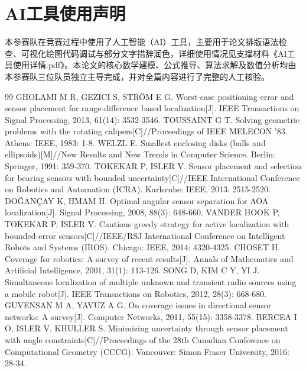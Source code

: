 \documentclass[zihao=-4,a4paper,UTF8]{ctexart}
\begin{document}
\section*{AI工具使用声明}
本参赛队在竞赛过程中使用了人工智能（AI）工具，主要用于论文排版语法检查、可视化绘图代码调试与部分文字措辞润色，详细使用情况见支撑材料《AI工具使用详情.pdf》。本论文的核心数学建模、公式推导、算法求解及数值分析均由本参赛队三位队员独立主导完成，并对全篇内容进行了完整的人工核验。

\begin{thebibliography}{99}
\setlength{\itemsep}{-1.5pt}
\setlength{\parskip}{0pt}
 GHOLAMI M R, GEZICI S, STR\"OM E G. Worst-case positioning error and sensor placement for range-difference based localization[J]. IEEE Transactions on Signal Processing, 2013, 61(14): 3532-3546.
 TOUSSAINT G T. Solving geometric problems with the rotating calipers[C]//Proceedings of IEEE MELECON '83. Athens: IEEE, 1983: 1-8.
 WELZL E. Smallest enclosing disks (balls and ellipsoids)[M]//New Results and New Trends in Computer Science. Berlin: Springer, 1991: 359-370.
 TOKEKAR P, ISLER V. Sensor placement and selection for bearing sensors with bounded uncertainty[C]//IEEE International Conference on Robotics and Automation (ICRA). Karlsruhe: IEEE, 2013: 2515-2520.
 DO\u{G}AN\c{C}AY K, HMAM H. Optimal angular sensor separation for AOA localization[J]. Signal Processing, 2008, 88(3): 648-660.
 VANDER HOOK P, TOKEKAR P, ISLER V. Cautious greedy strategy for active localization with bounded-error sensors[C]//IEEE/RSJ International Conference on Intelligent Robots and Systems (IROS). Chicago: IEEE, 2014: 4320-4325.
 CHOSET H. Coverage for robotics: A survey of recent results[J]. Annals of Mathematics and Artificial Intelligence, 2001, 31(1): 113-126.
 SONG D, KIM C Y, YI J. Simultaneous localization of multiple unknown and transient radio sources using a mobile robot[J]. IEEE Transactions on Robotics, 2012, 28(3): 668-680.
 GUVENSAN M A, YAVUZ A G. On coverage issues in directional sensor networks: A survey[J]. Computer Networks, 2011, 55(15): 3358-3378.
 BERCEA I O, ISLER V, KHULLER S. Minimizing uncertainty through sensor placement with angle constraints[C]//Proceedings of the 28th Canadian Conference on Computational Geometry (CCCG). Vancouver: Simon Fraser University, 2016: 28-34.
\end{thebibliography}
\end{document}
